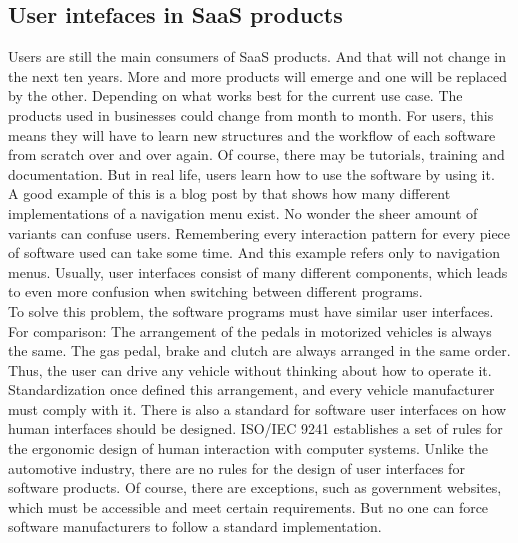 \subsection{User intefaces in \ac{SaaS} products}
Users are still the main consumers of \ac{SaaS} products. And that will not change in the next ten years. More and more products will emerge and one will be replaced by the other. Depending on what works best for the current use case. The products used in businesses could change from month to month. For users, this means they will have to learn new structures and the workflow of each software from scratch over and over again. Of course, there may be tutorials, training and documentation. But in real life, users learn how to use the software by using it. \\
A good example of this is a blog post by \citeauthor{sernoff_website_2021} that shows how many different implementations of a navigation menu exist. No wonder the sheer amount of variants can confuse users. Remembering every interaction pattern for every piece of software used can take some time. And this example refers only to navigation menus. Usually, user interfaces consist of many different components, which leads to even more confusion when switching between different programs. \\
To solve this problem, the software programs must have similar user interfaces. For comparison: The arrangement of the pedals in motorized vehicles is always the same. The gas pedal, brake and clutch are always arranged in the same order. Thus, the user can drive any vehicle without thinking about how to operate it. Standardization once defined this arrangement, and every vehicle manufacturer must comply with it. There is also a standard for software user interfaces on how human interfaces should be designed. ISO/IEC 9241 establishes a set of rules for the ergonomic design of human interaction with computer systems. Unlike the automotive industry, there are no rules for the design of user interfaces for software products. Of course, there are exceptions, such as government websites, which must be accessible and meet certain requirements. But no one can force software manufacturers to follow a standard implementation. \\

